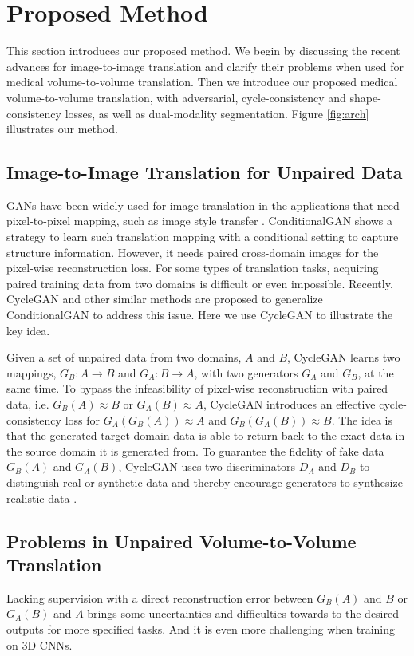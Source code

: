 \documentclass[10pt,twocolumn,letterpaper]{article}
\begin{document}
\section{Proposed Method}
This section introduces our proposed method. We begin by discussing the recent advances for image-to-image translation and clarify their problems when used for medical volume-to-volume translation. Then we introduce our proposed medical volume-to-volume translation, with adversarial, cycle-consistency and shape-consistency losses, as well as dual-modality segmentation. Figure \ref{fig:arch} illustrates our method.

\subsection{Image-to-Image Translation for Unpaired Data}
GANs have been widely used for image translation in the applications that need pixel-to-pixel mapping, such as image style transfer \cite{zhang2016colorful}. ConditionalGAN \cite{isola2016image} shows a strategy to learn such translation mapping with a conditional setting to capture structure information.
However, it needs paired cross-domain images for the pixel-wise reconstruction loss. For some types of translation tasks, acquiring paired training data from two domains is difficult or even impossible. Recently, CycleGAN \cite{zhu2017unpaired} and other similar methods \cite{kim2017learning,yi2017dualgan} are proposed to generalize ConditionalGAN to address this issue.  Here we use CycleGAN to illustrate the key idea.

Given a set of unpaired data from two domains, $A$ and $B$, CycleGAN learns two mappings, $G_B: A \rightarrow B$ and  $G_A: B \rightarrow A$, with two generators $G_A$ and $G_B$, at the same time. To bypass the infeasibility of pixel-wise reconstruction with paired data, i.e. $G_B(A) \approx B$ or $G_A(B) \approx A$, CycleGAN introduces an effective cycle-consistency loss for $G_A(G_B(A)) \approx A$ and $G_B(G_A(B)) \approx B$. The idea is that the generated target domain data is able to return back to the exact data in the source domain it is generated from.
To guarantee the fidelity of fake data $G_B(A)$ and $G_A(B)$, CycleGAN uses two discriminators $D_A$ and $D_B$ to distinguish real or synthetic data and thereby encourage generators to synthesize realistic data \cite{goodfellow2014generative}. 

\subsection{Problems in Unpaired Volume-to-Volume Translation}
Lacking supervision with a direct reconstruction error between $G_B(A)$ and $B$ or $G_A(B)$ and $A$ brings some uncertainties and difficulties towards to the desired outputs for more specified tasks. And it is even more challenging when training on 3D CNNs.
\end{document}
